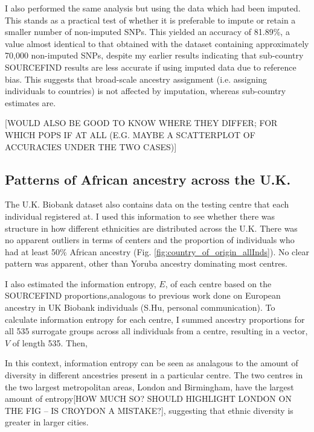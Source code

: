I also performed the same analysis but using the data which had been imputed. This stands as a practical test of whether it is preferable to impute or retain a smaller number of non-imputed SNPs. This yielded an accuracy of 81.89\%, a value almost identical to that obtained with the dataset containing approximately 70,000 non-imputed SNPs, despite my earlier results indicating that sub-country SOURCEFIND results are less accurate if using imputed data due to reference bias. This suggests that broad-scale ancestry assignment (i.e. assigning individuals to countries) is not affected by imputation, whereas sub-country estimates are. 

{\color{red}[WOULD ALSO BE GOOD TO KNOW WHERE THEY DIFFER; FOR WHICH POPS IF AT ALL (E.G. MAYBE A SCATTERPLOT OF ACCURACIES UNDER THE TWO CASES)]}


\subsection{Patterns of African ancestry across the U.K.}

The U.K. Biobank dataset also contains data on the testing centre that each individual registered at. I used this information to see whether there was structure in how different ethnicities are distributed across the U.K. There was no apparent outliers in terms of centers and the proportion of individuals who had at least 50\% African ancestry (Fig. \ref{fig:country_of_origin_allInds}). No clear pattern was apparent, other than Yoruba ancestry dominating most centres. 
 
I also estimated the information entropy, $E$, of each centre based on the SOURCEFIND proportions,analogous to previous work done on European ancestry in UK Biobank individuals (S.Hu, personal communication). To calculate information entropy for each centre, I summed ancestry proportions for all 535 surrogate groups across all individuals from a centre, resulting in a vector, $V$ of length 535. Then,  


 In this context, information entropy can be seen as analagous to the amount of diversity in different ancestries present in a particular centre. The two centres in the two largest metropolitan areas, London and Birmingham, have the largest amount of entropy{\color{red}[HOW MUCH SO? SHOULD HIGHLIGHT LONDON ON THE FIG -- IS CROYDON A MISTAKE?]}, suggesting that ethnic diversity is greater in larger cities.

